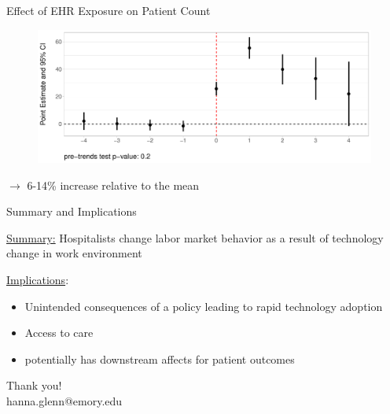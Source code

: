 \documentclass[notes,11pt, aspectratio=169]{beamer}
\begin{document}
\begin{frame}{Effect of EHR Exposure on Patient Count}
\label{Effect of EHR Exposure on Patient Count}
\label{Results: Patient Count}
\begin{figure}[ht]
\centering
\includegraphics[scale=.5]{Objects/patient_plot_all.pdf}
\end{figure}
$\rightarrow$ 6-14\% increase relative to the mean\\ \hyperlink{patient count broken down by group}{}

\hyperlink{Robustness: Patient Count}{}
\end{frame}



\begin{frame}{Summary and Implications}

\underline{Summary:} Hospitalists change labor market behavior as a result of technology change in work environment

                \vspace{5mm}

\underline{Implications}: 
\begin{itemize}
\item Unintended consequences of a policy leading to rapid technology adoption
\item Access to care
\item potentially has downstream affects for patient outcomes
\end{itemize}
\end{frame}

\begin{frame}{}
    \centering
    Thank you! \\
    hanna.glenn@emory.edu
\end{frame}
\end{document}
